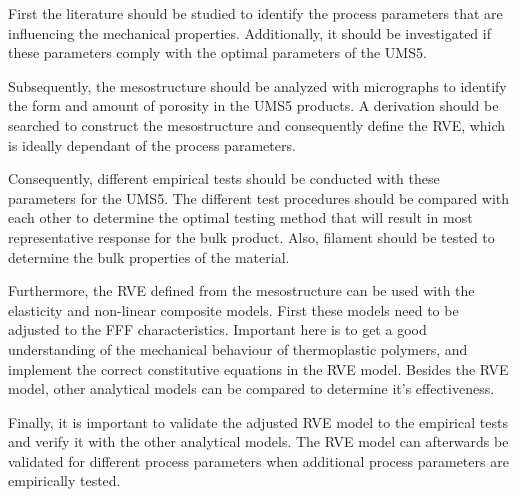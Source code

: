 First the literature should be studied to identify the process parameters that are influencing the mechanical properties. Additionally, it should be investigated if these parameters comply with the optimal parameters of the UMS5.

Subsequently, the mesostructure should be analyzed with micrographs to identify the form and amount of porosity in the UMS5 products.  A derivation should be searched to construct the mesostructure and consequently define the RVE, which is ideally dependant of the process parameters. 

Consequently, different empirical tests should be conducted with these parameters for the UMS5. The different test procedures should be compared with each other to determine the optimal testing method that will result in most representative response for the bulk product. Also, filament should be tested to determine the bulk properties of the material.

Furthermore, the RVE defined from the mesostructure can be used with the elasticity and non-linear composite models. First these models need to be adjusted to the FFF characteristics. Important here is to get a good understanding of the mechanical behaviour of thermoplastic polymers, and implement the correct constitutive equations in the RVE model. Besides the RVE model, other analytical models can be compared to determine it's effectiveness.  

Finally, it is important to validate the adjusted RVE model to the empirical tests and verify it with the other analytical models. The RVE model can afterwards be validated for different process parameters when additional process parameters are empirically tested. 



